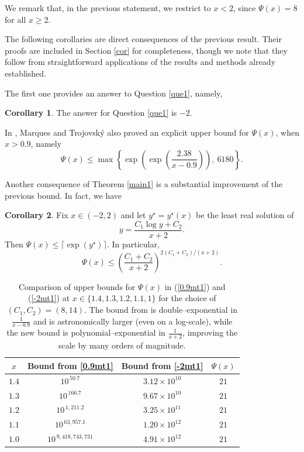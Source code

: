 \documentclass[10pt]{amsart}
\theoremstyle{definition} %
\newtheorem{corollary}{Corollary}[section]
\numberwithin{equation}{section}
\def\dfrac {\displaystyle\frac}
\def\dfrac {\displaystyle\frac}
\begin{document}
We remark that, in the previous statement, we restrict to \(x < 2\), since \(\Psi(x) = 8\) for all \(x \geq 2\).


The following corollaries are direct consequences of the previous result. Their proofs are included in Section \ref{cor} for completeness, though we note that they follow from straightforward applications of the results and methods already established.

The first one provides an answer to Question \ref{que1}, namely,

\begin{corollary}\label{C1}
    The answer for Question \ref{que1} is $-2$.
\end{corollary}

In \cite{mt1}, Marques and Trojovsk\' y also proved an explicit upper bound for $\Psi(x)$, when $x>0.9$, namely
\begin{equation}\label{0.9mt1}
    \Psi(x) \leq \max\left\{\exp\left(\exp \left(\frac{2.38}{x-0.9}\right)\right),\ 6180\right\}.
\end{equation}

Another consequence of Theorem \ref{main1} is a substantial improvement of the previous bound. In fact, we have
\begin{corollary}\label{C3}
Fix $x\in (-2,2)$ and let $y^\star=y^\star(x)$ be the least real solution of
\[
y=\frac{C_1\log y + C_2}{x+2}.
\]
Then $\Psi(x)\leq \lceil \exp(y^{\star}) \rceil$. In particular,
\begin{equation}\label{-2mt1}
    \Psi(x) \leq \left(\dfrac{C_1+C_2}{x+2}\right)^{2(C_1+C_2)/(x+2)}.
\end{equation}
\end{corollary}

\begin{table}[h!]
\centering
\begin{tabular}{c|c|c|c}
\hline
$x$ & Bound from \eqref{0.9mt1} & Bound from \eqref{-2mt1}  &  $\Psi(x)$ \\
\hline
$1.4$ & $10^{\,50.7}$ & $3.12\times 10^{10}$ & $21$ \\
$1.3$ & $10^{\,166.7}$ & $9.67\times 10^{10}$ & $21$ \\
$1.2$ & $10^{\,1,211.2}$ & $3.25\times 10^{11}$ & $21$ \\
$1.1$ & $10^{\,63,957.1}$ & $1.20\times 10^{12}$ & $21$ \\
$1.0$ & $10^{\,9,418,743,731}$ & $4.91\times 10^{12}$ & $21$ \\
\hline
\end{tabular}

\bigskip
\caption{Comparison of upper bounds for $\Psi(x)$ in (\ref{0.9mt1}) and (\ref{-2mt1}) at $x\in\{1.4,1.3,1.2,1.1,1\}$ for the choice of $(C_1,C_2)=(8,14)$. The bound from \cite{mt1} is double–exponential in $\frac{1}{x-0.9}$ and is astronomically larger 
(even on a log-scale), while the new bound is polynomial–exponential in $\frac{1}{x+2}$, 
improving the scale by many orders of magnitude.}
\label{tab:psi-bounds-compare}
\end{table}
\end{document}
